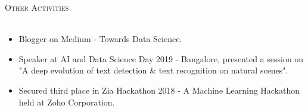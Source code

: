 \documentclass[a4paper]{article}
\newcommand{\lineunder} {
    \vspace*{-8pt} \\
    \hspace*{-18pt} \hrulefill \\
}
\newcommand{\header} [1] {
    {\hspace*{-18pt}\vspace*{6pt} \textsc{#1}}
    \vspace*{-6pt} \lineunder
}
\begin{document}
\header{Other Activities}
    \begin{itemize}
    \item Blogger on Medium - Towards Data Science.
    \item Speaker at AI and Data Science Day 2019 - Bangalore, presented a session on "A deep evolution of text detection \& text recognition on natural scenes".
    \item Secured third place in Zia Hackathon 2018 - A Machine Learning Hackathon held at Zoho Corporation.
    \end{itemize}

\vspace*{2mm}
\end{document}
